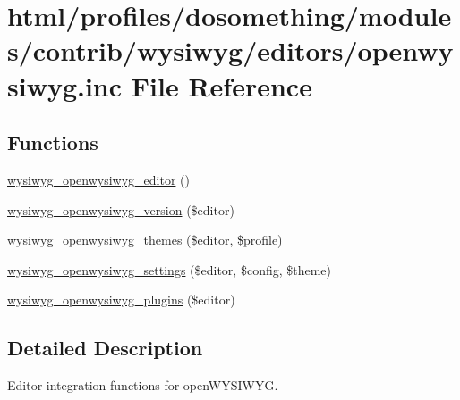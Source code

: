 \hypertarget{openwysiwyg_8inc}{
\section{html/profiles/dosomething/modules/contrib/wysiwyg/editors/openwysiwyg.inc File Reference}
\label{openwysiwyg_8inc}
}
\subsection*{Functions}
\begin{DoxyCompactItemize}
\item 
\hyperlink{openwysiwyg_8inc_a7c46ef5a74e5ae97ec4a95682acaef9c}{wysiwyg\_\-openwysiwyg\_\-editor} ()
\item 
\hyperlink{openwysiwyg_8inc_a6beb3b3973b4624fb804889787c943b4}{wysiwyg\_\-openwysiwyg\_\-version} (\$editor)
\item 
\hyperlink{openwysiwyg_8inc_a85aa49716b4d822b58a03fa426890b03}{wysiwyg\_\-openwysiwyg\_\-themes} (\$editor, \$profile)
\item 
\hyperlink{openwysiwyg_8inc_a2a604d0692cdfd7a3e01946f60eb8e73}{wysiwyg\_\-openwysiwyg\_\-settings} (\$editor, \$config, \$theme)
\item 
\hyperlink{openwysiwyg_8inc_a7107bf053029e89ae2c347c94fbc8b5d}{wysiwyg\_\-openwysiwyg\_\-plugins} (\$editor)
\end{DoxyCompactItemize}


\subsection{Detailed Description}
Editor integration functions for openWYSIWYG. 

